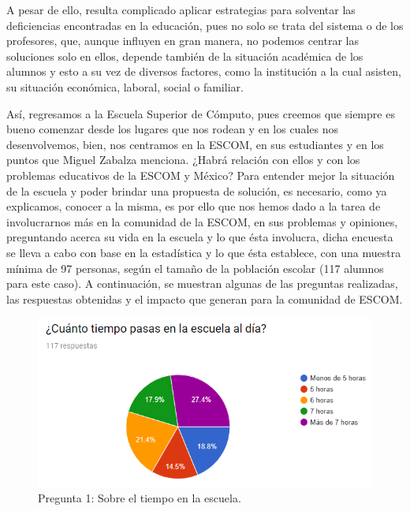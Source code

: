 \noindent
\newline
A pesar de ello, resulta complicado aplicar estrategias para solventar las deficiencias encontradas en la
educación, pues no solo se trata del sistema o de los profesores, que, aunque influyen en gran manera, no
podemos centrar las soluciones solo en ellos, depende también de la situación académica de los alumnos
y esto a su vez de diversos factores, como la institución a la cual asisten, su situación económica, laboral,
social o familiar. 

\noindent
Así, regresamos a la Escuela Superior de Cómputo, pues creemos que siempre es bueno comenzar desde los 
lugares que nos rodean y en los cuales nos desenvolvemos, bien, nos centramos en la ESCOM, en sus 
estudiantes y en los puntos que Miguel Zabalza menciona. ¿Habrá relación con ellos y con los problemas 
educativos de la ESCOM y México? Para entender mejor la situación de la escuela y poder brindar una propuesta 
de solución, es necesario, como ya explicamos, conocer a la misma, es por ello que nos hemos dado a la tarea 
de involucrarnos más en la comunidad de la ESCOM, en sus problemas y opiniones, preguntando
acerca su vida en la escuela y lo que ésta involucra, dicha encuesta se lleva a cabo con base en la
estadística y lo que ésta establece, con una muestra mínima de 97 personas, según el tamaño de la población
escolar (117 alumnos para este caso). 
A continuación, se muestran algunas de las preguntas realizadas, las respuestas obtenidas y el impacto que
generan para la comunidad de ESCOM. 

\pagebreak
\begin{figure}[htbp!]
	\centering
	\includegraphics[width=1\textwidth]{intro/images_justificacion/encuesta_horasEnESCOM}
	\caption{Pregunta 1: Sobre el tiempo en la escuela.}
\end{figure}


